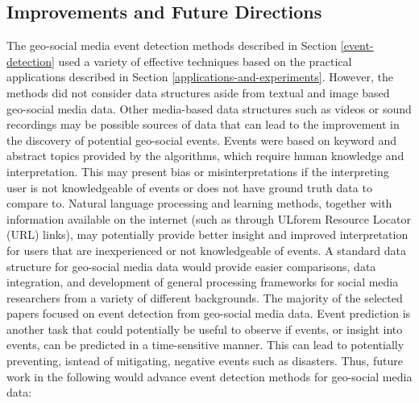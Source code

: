 \subsection{Improvements and Future Directions} \label{improvements-and-future-directions}

The geo-social media event detection methods described in Section \ref{event-detection} used a variety of effective techniques based on the practical applications described in Section \ref{applications-and-experiments}. However, the methods did not consider data structures aside from textual and image based geo-social media data. Other media-based data structures such as videos or sound recordings may be possible sources of data that can lead to the improvement in the discovery of potential geo-social events. Events were based on keyword and abstract topics provided by the algorithms, which require human knowledge and interpretation. This may present bias or misinterpretations if the interpreting user is not knowledgeable of events or does not have ground truth data to compare to. Natural language processing and learning methods, together with information available on the internet (such as through ULforem Resource Locator (URL) links), may potentially provide better insight and improved interpretation for users that are inexperienced or not knowledgeable of events. A standard data structure for geo-social media data would provide easier comparisons, data integration, and development of general processing frameworks for social media researchers from a variety of different backgrounds. The majority of the selected papers focused on event detection from geo-social media data. Event prediction is another task that could potentially be useful to observe if events, or insight into events, can be predicted in a time-sensitive manner. This can lead to potentially preventing, isntead of mitigating, negative events such as disasters. Thus, future work in the following would advance event detection methods for geo-social media data:

